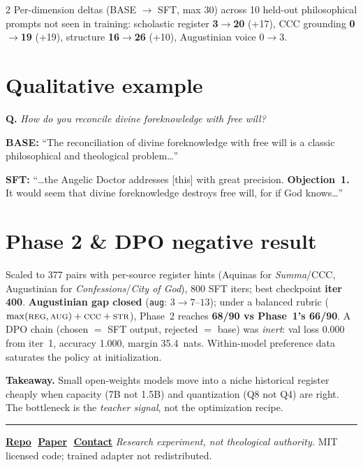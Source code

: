 \documentclass[a4paper,9pt]{extarticle}
\begin{document}
\begin{multicols}{2}
\noindent Per-dimension deltas (BASE $\to$ SFT, max 30) across 10
held-out philosophical prompts not seen in training: scholastic
register \textbf{3$\to$20} (+17), CCC grounding \textbf{0$\to$19} (+19),
structure \textbf{16$\to$26} (+10), Augustinian voice 0$\to$3.

\section*{Qualitative example}
\noindent\textbf{Q.} \emph{How do you reconcile divine foreknowledge
with free will?}

\smallskip\noindent\textbf{BASE:} ``The reconciliation of divine
foreknowledge with free will is a classic philosophical and theological
problem\dots''

\smallskip\noindent\textbf{SFT:} ``\dots the Angelic Doctor addresses
[this] with great precision. \textbf{Objection~1.} It would seem that
divine foreknowledge destroys free will, for if God knows\dots''

\section*{Phase 2 \& DPO negative result}
Scaled to 377 pairs with per-source register hints (Aquinas for
\emph{Summa}/CCC, Augustinian for \emph{Confessions}/\emph{City of
God}), 800 SFT iters; best checkpoint \textbf{iter 400}.
\textbf{Augustinian gap closed} (\texttt{aug}: $3 \to 7$--$13$); under a
balanced rubric ($\max(\textsc{reg},\textsc{aug}) + \textsc{ccc} +
\textsc{str}$), Phase~2 reaches \textbf{68/90 vs Phase~1's 66/90}. A
DPO chain (chosen $=$ SFT output, rejected $=$ base) was \emph{inert}:
val loss 0.000 from iter~1, accuracy 1.000, margin 35.4~nats.
Within-model preference data saturates the policy at initialization.

\smallskip\noindent\textbf{Takeaway.} Small open-weights models move into a
niche historical register cheaply when capacity (7B not 1.5B) and
quantization (Q8 not Q4) are right. The bottleneck is the \emph{teacher
signal}, not the optimization recipe.

\end{multicols}

\vfill
\noindent\textcolor{accent!40}{\rule{\linewidth}{0.6pt}}

\vspace{0.15em}
\noindent\footnotesize%
\href{https://github.com/pleyva2004/scholastic-llm}{\textbf{Repo}}\,\textbar{}\,%
\href{https://pleyva2004.github.io/scholastic-llm/main.pdf}{\textbf{Paper}}\,\textbar{}\,%
\href{mailto:pleyva2004@gmail.com}{\textbf{Contact}}\quad
\emph{Research experiment, not theological authority.}\quad
MIT licensed code; trained adapter not redistributed.
\normalsize
\end{document}
